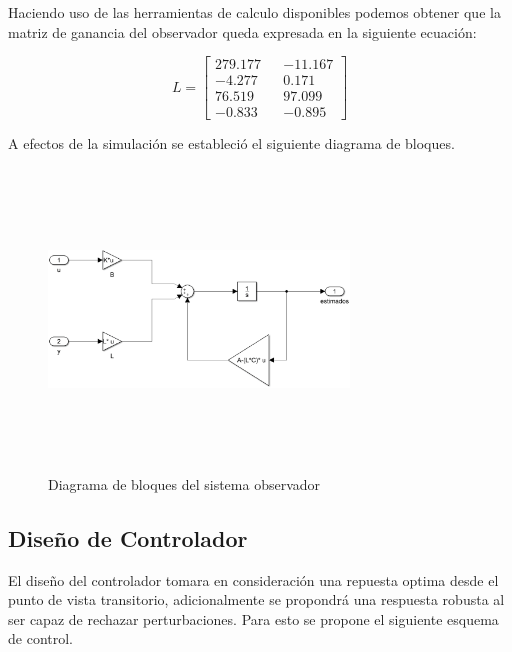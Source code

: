 \documentclass[journal,twoside,web]{ieeecolor}
\begin{document}
	Haciendo uso de las herramientas de calculo disponibles podemos obtener que la matriz de ganancia del observador queda expresada en la siguiente ecuación:
	
	\begin{equation}
		L = \begin{bmatrix}
				279.177 && -11.167 \\
				-4.277 && 0.171 \\
				76.519 && 97.099 \\
				-0.833 && -0.895
			\end{bmatrix}
	\end{equation}
	
	A efectos de la simulación se estableció el siguiente diagrama de bloques.
	
	\begin{figure}[h]
		\begin{center}
			\includegraphics[width=8cm,height=8cm,keepaspectratio]{observer}
			\caption{ Diagrama de bloques del sistema observador \label{observer_system}}
		\end{center}
	\end{figure}
	
	\subsection{Diseño de Controlador}
	
	El diseño del controlador tomara en consideración una repuesta optima desde el punto de vista transitorio, adicionalmente se propondrá una respuesta robusta al ser capaz de rechazar perturbaciones. Para esto se propone el siguiente esquema de control.
	
\end{document}
